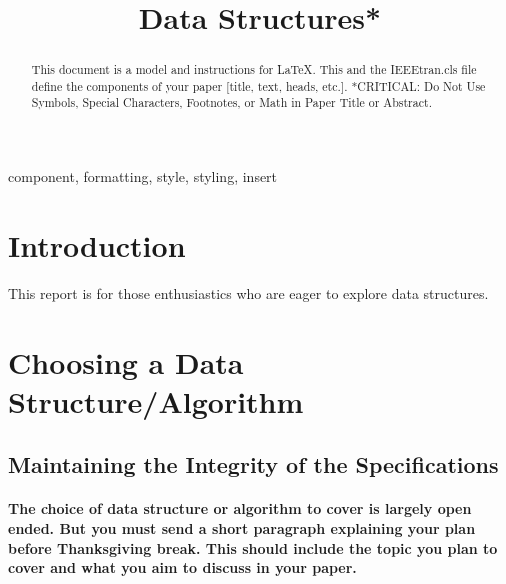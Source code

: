 \documentclass[conference]{IEEEtran}
\begin{document}
\title{Data Structures*\\
}

\author
{


}

\maketitle

\begin{abstract}
This document is a model and instructions for \LaTeX.
This and the IEEEtran.cls file define the components of your paper [title, text, heads, etc.]. *CRITICAL: Do Not Use Symbols, Special Characters, Footnotes, 
or Math in Paper Title or Abstract.
\end{abstract}

\begin{IEEEkeywords}
component, formatting, style, styling, insert
\end{IEEEkeywords}

\section{Introduction}
This report is for those enthusiastics who are eager to explore data structures.

\section{Choosing a Data Structure/Algorithm
	}

\subsection{Maintaining the Integrity of the Specifications}
\paragraph{
The choice of data structure or algorithm to cover is largely open ended. But you must send a short paragraph explaining your plan before Thanksgiving break. This should include the topic you plan to cover and what you aim to discuss in your paper. }
\end{document}
